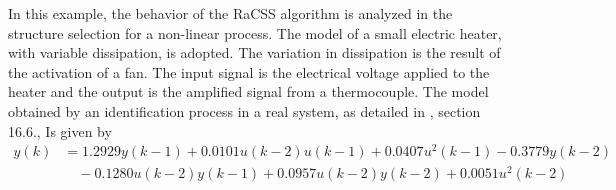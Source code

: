 
\begin{exmp} \label{ex:53}


  In this example, the behavior of the RaCSS algorithm is analyzed in the structure selection for a non-linear process. The model of a small electric heater, with variable dissipation, is adopted. The variation in dissipation is the result of the activation of a fan. The input signal is the electrical voltage applied to the heater and the output is the amplified signal from a thermocouple. The model obtained by an identification process in a real system, as detailed in \citep{aguirre2015}, section 16.6., Is given by
 \begin{align}
   y(k) &= 1.2929y(k-1) + 0.0101u(k-2)u(k-1) + 0.0407u^2(k-1) - 0.3779y(k-2) \\
        &\quad - 0.1280u(k-2)y(k-1) + 0.0957u(k-2)y(k-2) + 0.0051u^2(k-2)
 \label{eq:ex53_model}
 \end{align}
 

\end{exmp}
